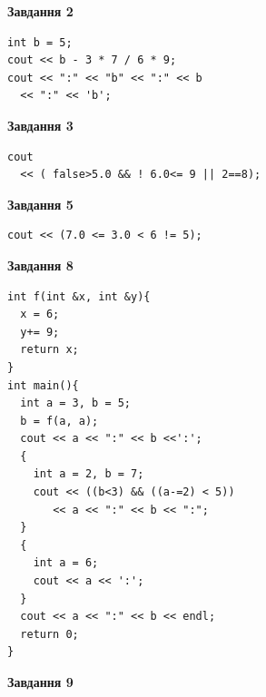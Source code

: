 \documentclass[12pt, ukrainian]{article}
\begin{document}
{\begin {large}
\begin{minipage}[t]{7.0cm}
\end{minipage}
\vline \hspace{1mm}
\begin{minipage}[t]{11.0cm}

\begin{center}
\textbf{Завдання 2}
\end{center}
\vspace{-8mm}

\begin{verbatim}
int b = 5;
cout << b - 3 * 7 / 6 * 9;
cout << ":" << "b" << ":" << b 
  << ":" << 'b';
\end{verbatim}



\begin{center}
\textbf{Завдання 3}
\end{center}
\vspace{-8mm}

\begin{verbatim}
cout 
  << ( false>5.0 && ! 6.0<= 9 || 2==8);
\end{verbatim}



\begin{center}
\textbf{Завдання 5}
\end{center}
\vspace{-8mm}

\begin{verbatim}
cout << (7.0 <= 3.0 < 6 != 5);
\end{verbatim}



\begin{center}
\textbf{Завдання 8}
\end{center}
\vspace{-8mm}

\begin{verbatim}
int f(int &x, int &y){
  x = 6;
  y+= 9;
  return x;
}
int main(){
  int a = 3, b = 5;
  b = f(a, a);
  cout << a << ":" << b <<':';
  {
    int a = 2, b = 7;
    cout << ((b<3) && ((a-=2) < 5))
       << a << ":" << b << ":";
  }
  {
    int a = 6;
    cout << a << ':';
  }
  cout << a << ":" << b << endl;
  return 0;
}
\end{verbatim}

\end{minipage}


\begin{minipage}[t]{7.0cm}

\begin{center}
\textbf{Завдання 9}
\end{center}
\vspace{-8mm}


\end{minipage}
\end{large}}
\end{document}
